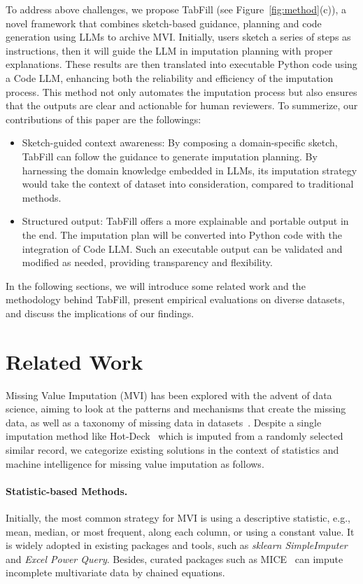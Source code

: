 \documentclass[sigconf]{acmart}
\begin{document}
To address above challenges, we propose TabFill (see Figure~\ref{fig:method}(c)), a novel framework that combines sketch-based guidance, planning and code generation using LLMs to archive MVI. Initially, users sketch a series of steps as instructions, then it will guide the LLM in imputation planning with proper explanations. These results are then translated into executable Python code using a Code LLM, enhancing both the reliability and efficiency of the imputation process. This method not only automates the imputation process but also ensures that the outputs are clear and actionable for human reviewers. To summerize, our contributions of this paper are the followings:
\begin{itemize}
  \item Sketch-guided context awareness:
  By composing a domain-specific sketch, TabFill can follow the guidance to generate imputation planning. By harnessing the domain knowledge embedded in LLMs, its imputation strategy would take the context of dataset into consideration, compared to traditional methods.
  \item Structured output:
  TabFill offers a more explainable and portable output in the end. The imputation plan will be converted into Python code with the integration of Code LLM. Such an executable output can be validated and modified as needed, providing transparency and flexibility.

\end{itemize}

In the following sections, we will introduce some related work and the methodology behind TabFill, present empirical evaluations on diverse datasets, and discuss the implications of our findings.


\section{Related Work}

Missing Value Imputation (MVI) has been explored with the advent of data science, aiming to look at the patterns and mechanisms that create the missing data, as well as a taxonomy of missing data in datasets~\cite{little2019statistical}. Despite a single imputation method like Hot-Deck~\cite{andridge2010review} which is imputed from a randomly selected similar record, we categorize existing solutions in the context of statistics and machine intelligence for missing value imputation as follows.

\paragraph{Statistic-based Methods.}
Initially, the most common strategy for MVI is using a descriptive statistic, e.g., mean, median, or most frequent, along each column, or using a constant value. It is widely adopted in existing packages and tools, such as \textit{sklearn SimpleImputer}~\cite{scikit-learn} and \emph{Excel Power Query}. Besides, curated packages such as MICE~\cite{van2011mice} can impute incomplete multivariate data by chained equations. 
\end{document}
